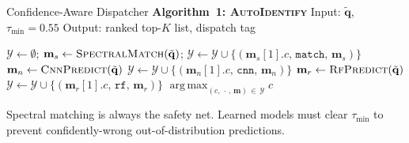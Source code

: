 \documentclass[aspectratio=169,10pt]{beamer}
\DeclareMathOperator*{\argmax}{arg\,max}
\begin{document}
\begin{frame}{Confidence-Aware Dispatcher}
  \textbf{\color{headerbg}Algorithm~1: \textsc{AutoIdentify}}\enspace
  {\footnotesize Input: $\tilde{\mathbf{q}}$, $\tau_{\min}=0.55$\quad
   Output: ranked top-$K$ list, dispatch tag}

  \smallskip
  \begin{tcolorbox}[enhanced, colback=white, colframe=gray!35,
      arc=2pt, boxrule=0.5pt, left=4pt, right=4pt, top=3pt, bottom=3pt]
    \scriptsize
    \begin{algorithmic}[1]
      \State $\mathcal{Y}\leftarrow\emptyset$;\quad
             $\mathbf{m}_s\leftarrow\textsc{SpectralMatch}(\tilde{\mathbf{q}})$;\quad
             $\mathcal{Y}\leftarrow\mathcal{Y}\cup\{(\mathbf{m}_s[1].c,\,\texttt{match},\,\mathbf{m}_s)\}$
        \State $\mathbf{m}_n\leftarrow\textsc{CnnPredict}(\tilde{\mathbf{q}})$
        \enspace
          $\mathcal{Y}\leftarrow\mathcal{Y}\cup\{(\mathbf{m}_n[1].c,\,\texttt{cnn},\,\mathbf{m}_n)\}$
        \EndIf
      \EndIf
        \State $\mathbf{m}_r\leftarrow\textsc{RfPredict}(\tilde{\mathbf{q}})$
        \enspace
          $\mathcal{Y}\leftarrow\mathcal{Y}\cup\{(\mathbf{m}_r[1].c,\,\texttt{rf},\,\mathbf{m}_r)\}$
        \EndIf
      \EndIf
      \State \Return $\argmax_{(c,\,\cdot\,,\,\mathbf{m})\,\in\,\mathcal{Y}}c$
    \end{algorithmic}
  \end{tcolorbox}

  \vspace{0.10cm}
  \begin{tcolorbox}[notebox, top=2pt, bottom=2pt]
    \small Spectral matching is always the safety net.
    Learned models must clear $\tau_{\min}$ to prevent
    confidently-wrong out-of-distribution predictions.
  \end{tcolorbox}
\end{frame}
\end{document}
